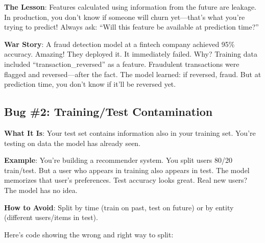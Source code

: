 \documentclass[11pt,oneside]{book}
\begin{document}
\textbf{The Lesson}: Features calculated using information from the future are leakage. In production, you don't know if someone will churn yet—that's what you're trying to predict! Always ask: ``Will this feature be available at prediction time?''

\textbf{War Story}: A fraud detection model at a fintech company achieved 95\% accuracy. Amazing! They deployed it. It immediately failed. Why? Training data included ``transaction\_reversed'' as a feature. Fraudulent transactions were flagged and reversed—after the fact. The model learned: if reversed, fraud. But at prediction time, you don't know if it'll be reversed yet.

\subsection{Bug \#2: Training/Test Contamination}

\textbf{What It Is}: Your test set contains information also in your training set. You're testing on data the model has already seen.

\textbf{Example}: You're building a recommender system. You split users 80/20 train/test. But a user who appears in training also appears in test. The model memorizes that user's preferences. Test accuracy looks great. Real new users? The model has no idea.

\textbf{How to Avoid}: Split by time (train on past, test on future) or by entity (different users/items in test).

Here's code showing the wrong and right way to split:
\end{document}
